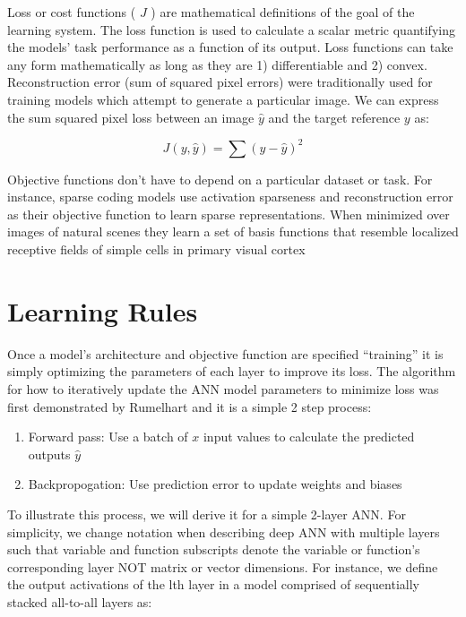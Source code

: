 \documentclass{templates/ucdenverthesis}
\begin{document}
Loss or cost functions ( \(J\) ) are mathematical definitions of the goal of the learning system. The loss function is used to calculate a scalar metric quantifying the models' task performance as a function of its output. Loss functions can take any form mathematically as long as they are 1) differentiable and 2) convex. Reconstruction error (sum of squared pixel errors) were traditionally used for training models which attempt to generate a particular image. We can express the sum squared pixel loss between an image \(\hat{y}\) and the target reference \(y\) as:

\[
J(y,\hat{y}) = \sum (y-\hat{y})^2
\]

Objective functions don't have to depend on a particular dataset or task. For instance, sparse coding models use activation sparseness and reconstruction error as their objective function to learn sparse representations. When minimized over images of natural scenes they learn a set of basis functions that resemble localized receptive fields of simple cells in primary visual cortex \autocite{Olshausen:1996kc}

\hypertarget{sec:learningrules}{%
\section{Learning Rules}\label{sec:learningrules}}

Once a model's architecture and objective function are specified ``training'' it is simply optimizing the parameters of each layer to improve its loss. The algorithm for how to iteratively update the ANN model parameters to minimize loss was first demonstrated by Rumelhart \autocite{Rumelhart:1986er} and it is a simple 2 step process:

\begin{enumerate}
\def\labelenumi{\arabic{enumi})}
\tightlist
\item
  Forward pass: Use a batch of \(x\) input values to calculate the predicted outputs \(\hat{y}\)
\item
  Backpropogation: Use prediction error to update weights and biases
\end{enumerate}

To illustrate this process, we will derive it for a simple 2-layer ANN. For simplicity, we change notation when describing deep ANN with multiple layers such that variable and function subscripts denote the variable or function's corresponding layer NOT matrix or vector dimensions. For instance, we define the output activations of the lth layer in a model comprised of sequentially stacked all-to-all layers as:
\end{document}
